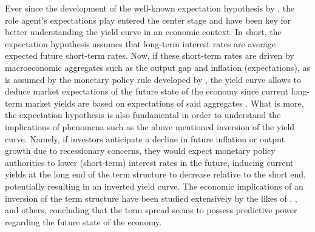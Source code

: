 Ever since the development of the well-known expectation hypothesis by \citet{hicks1946value}, the role agent's expectations play entered the center stage and have been key for better understanding the yield curve in an economic context.
In short, the expectation hypothesis assumes that long-term interest rates are average expected future short-term rates. 
Now, if these short-term rates are driven by macroeconomic aggregates such as the output gap and inflation (expectations), as is assumed by the monetary policy rule developed by \citet{taylor1993discretion}, the yield curve allows to deduce market expectations of the future state of the economy since current long-term market yields are based on expectations of said aggregates \citep{Gürkaynak_Wright_2012}. 
What is more, the expectation hypothesis is also fundamental in order to understand the implications of phenomena such as the above mentioned inversion of the yield curve. 
Namely, if investors anticipate a decline in future inflation or output growth due to recessionary concerns, they would expect monetary policy authorities to lower (short-term) interest rates in the future, inducing current yields at the long end of the term structure to decrease relative to the short end, potentially resulting in an inverted yield curve. The economic implications of an inversion of the term structure have been studied extensively by the likes of \citet{estrella1991term}, \citet{estrella1995term}, \citet{stock2003did} and others, concluding that the term spread seems to possess predictive power regarding the future state of the economy. 

